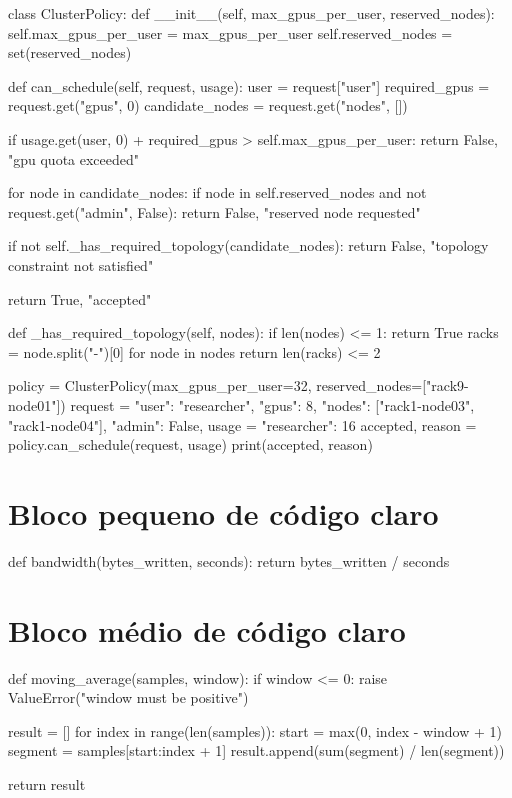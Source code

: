 \begin{VSTerminalCode}[title={Terminal grande}]
class ClusterPolicy:
    def __init__(self, max_gpus_per_user, reserved_nodes):
        self.max_gpus_per_user = max_gpus_per_user
        self.reserved_nodes = set(reserved_nodes)

    def can_schedule(self, request, usage):
        user = request["user"]
        required_gpus = request.get("gpus", 0)
        candidate_nodes = request.get("nodes", [])

        if usage.get(user, 0) + required_gpus > self.max_gpus_per_user:
            return False, "gpu quota exceeded"

        for node in candidate_nodes:
            if node in self.reserved_nodes and not request.get("admin", False):
                return False, "reserved node requested"

        if not self._has_required_topology(candidate_nodes):
            return False, "topology constraint not satisfied"

        return True, "accepted"

    def _has_required_topology(self, nodes):
        if len(nodes) <= 1:
            return True
        racks = {node.split("-")[0] for node in nodes}
        return len(racks) <= 2

policy = ClusterPolicy(max_gpus_per_user=32, reserved_nodes=["rack9-node01"])
request = {
    "user": "researcher",
    "gpus": 8,
    "nodes": ["rack1-node03", "rack1-node04"],
    "admin": False,
}
usage = {"researcher": 16}
accepted, reason = policy.can_schedule(request, usage)
print(accepted, reason)
\end{VSTerminalCode}

\clearpage
\section{Bloco pequeno de código claro}

\begin{VSCodeBlock}[title={Código pequeno}]
def bandwidth(bytes_written, seconds):
    return bytes_written / seconds
\end{VSCodeBlock}

\section{Bloco médio de código claro}

\begin{VSCodeBlock}[title={Código médio}]
def moving_average(samples, window):
    if window <= 0:
        raise ValueError("window must be positive")

    result = []
    for index in range(len(samples)):
        start = max(0, index - window + 1)
        segment = samples[start:index + 1]
        result.append(sum(segment) / len(segment))

    return result
\end{VSCodeBlock}

